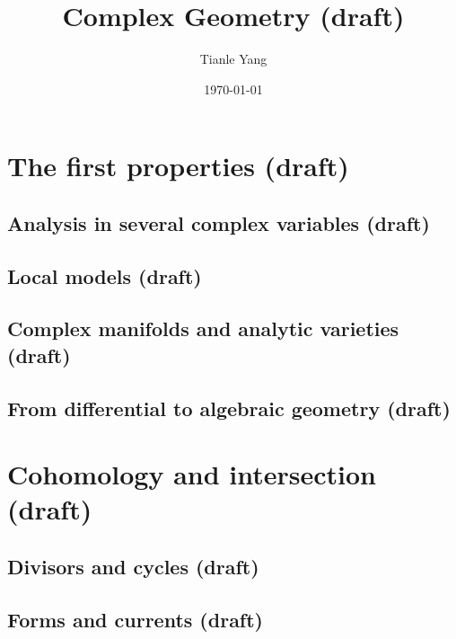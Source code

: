 \documentclass[sectionlevel=book]{noteformyself}
\title{Complex Geometry (draft)}
\author{Tianle Yang}
\date{\today}
\begin{document}
    \maketitle

    \frontmatter %

    \tableofcontents %

    \mainmatter %

    \chapter{The first properties (draft)}
        \section{Analysis in several complex variables (draft)}
        
        \section{Local models (draft)}
        
        \section{Complex manifolds and analytic varieties (draft)}
        
        \section{From differential to algebraic geometry (draft)}
        

    \chapter{Cohomology and intersection (draft)}
        \section{Divisors and cycles (draft)}
        
        \section{Forms and currents (draft)}
        
\end{document}
